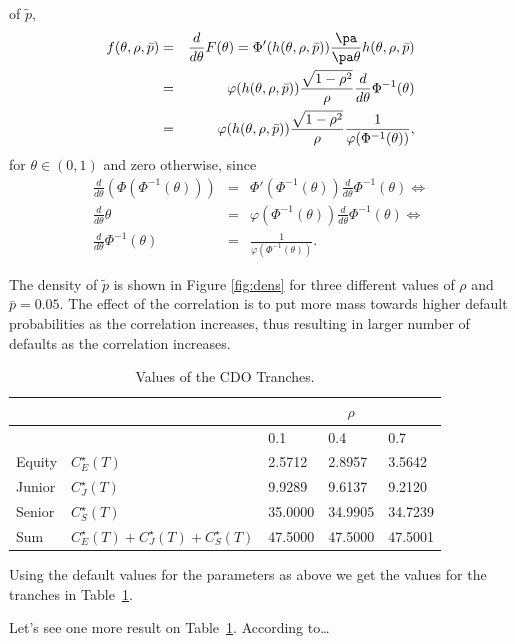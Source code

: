 of $\tilde{p}$,
\begin{eqnarray}
f(\theta, \rho, \bar{p}) &=& \frac{d}{d \theta} F(\theta) =
\Phi'(h(\theta, \rho, \bar{p})) \frac{\pa}{\pa \theta} h(\theta,
\rho, \bar{p}) \nonumber \\
&=& \varphi(h(\theta, \rho, \bar{p})) \frac{\sqrt{1 -
\rho^2}}{\rho} \frac{d}{d \theta} \Phi^{-1}(\theta) \nonumber \\
&=& \varphi(h(\theta, \rho, \bar{p})) \frac{\sqrt{1 - \rho^2}}{\rho}
\frac{1}{\varphi (\Phi^{-1}(\theta))}, \label{density}
\end{eqnarray}
for $\theta \in (0,1)$ and zero otherwise, since
\begin{eqnarray*}
\frac{d}{d \theta} \left(\Phi (\Phi^{-1}(\theta)) \right) &=&
\Phi'(\Phi^{-1}(\theta)) \frac{d}{d \theta} \Phi^{-1}(\theta)
\Leftrightarrow \\
\frac{d}{d \theta} \theta &=& \varphi(\Phi^{-1}(\theta))
\frac{d}{d \theta} \Phi^{-1}(\theta) \Leftrightarrow \\
\frac{d}{d \theta} \Phi^{-1}(\theta) &=&
\frac{1}{\varphi(\Phi^{-1}(\theta))}.
\end{eqnarray*}



The density of $\tilde{p}$ is shown in Figure \ref{fig:dens} for
three different values of $\rho$ and $\bar{p} = 0.05$. The effect of
the correlation is to put more mass towards higher default
probabilities as the correlation increases, thus resulting in larger
number of defaults as the correlation increases.

\begin{table}[htbp]
\caption{Values of the CDO Tranches.} \label{tab:cdo}
\begin{center}
\begin{tabular}{lllll}
\hline \hline
&            &             \multicolumn{ 3}{c}{$\rho$} \\
\hline
&            &       0.1 &        0.4 &        0.7 \\
\hline Equity &        $C_E^\star(T)$ &     2.5712 &     2.8957 &
3.5642 \\
Junior &        $C_J^\star(T)$ &     9.9289 &     9.6137 &
9.2120 \\
Senior &        $C_S^\star(T)$ &    35.0000 &    34.9905 &
34.7239 \\
\hline Sum & $C_E^\star(T) + C_J^\star(T) + C_S^\star(T)$ & 47.5000&
47.5000 &  47.5001 \\
\hline \hline
\end{tabular}
\end{center}
\end{table}
Using the default values for the parameters as above we get the
values for the tranches in Table~\ref{tab:cdo}.

Let's see one more result on Table~\ref{tab:cdo}. According to\ldots
